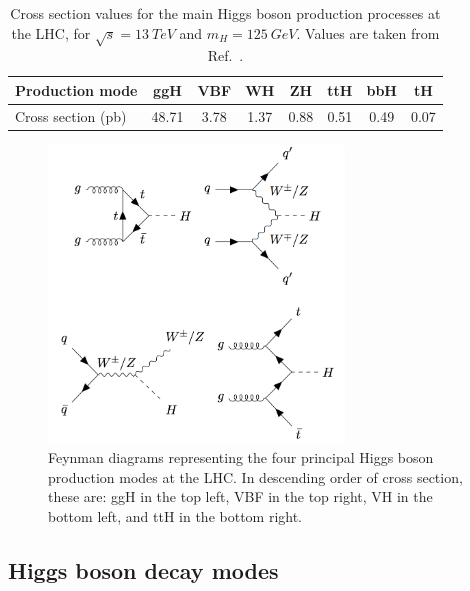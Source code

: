 \begin{table}
  \centering
  \begin{tabular}{ l | c c c c c c c }
      \hline
      Production mode & ggH & VBF & WH & ZH & ttH & bbH & tH  \\
      \hline
      Cross section (pb) & 48.71 & 3.78 & 1.37 & 0.88 & 0.51 & 0.49 & 0.07 \\
      \hline
  \end{tabular}%
  \caption[Cross sections of the main Higgs boson production processes.]
  {
    Cross section values for the main Higgs boson production processes at the LHC, 
    for $\sqrt{s}=\SI{13}{TeV}$ and $m_H = \SI{125}{GeV}$.
    Values are taken from Ref.~\cite{YR4}.
  }
  \label{tab:theory_prod}
\end{table}

\begin{figure}[hptb]
  \centering
  \includegraphics[width=0.7\textwidth]{Figures/Theory/FeynProd.png}
  \caption[Feynman diagrams of four Higgs boson production modes.]
  {
    Feynman diagrams representing the four principal Higgs boson production modes at the LHC.
    In descending order of cross section, these are: ggH in the top left, VBF in the top right, 
    VH in the bottom left, and ttH in the bottom right.
  }
  \label{fig:theory_FeynProd}
\end{figure}

\subsection{Higgs boson decay modes}

